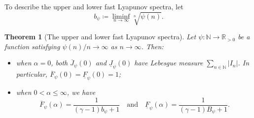 \documentclass[12pt,reqno]{amsart}
\newtheorem{thmy}{Theorem}
\renewcommand{\=}{\coloneqq}
\theoremstyle{plain}
\begin{document}
To describe the upper and lower fast Lyapunov spectra, let
\begin{equation*}\label{equ_constantsb}
   b_\psi \coloneqq \liminf_{n\to \infty}\sqrt[n]{\psi(n)}.
\end{equation*}


\begin{thmy}[The upper and lower fast Lyapunov spectra]\label{t.Upper_and_lower_fast_Lyapunov_spectrum}
Let $\psi:\mathbb{N}\to\mathbb{R}_{>0}$ be a function satisfying $\psi(n)/n \to \infty$ as $n\to \infty$. Then:
\begin{itemize}
  \item[(i)] when $\alpha =0$, both $\overline{J}_{\psi}(0)$ and $\underline{J}_{\psi}(0)$ have Lebesgue measure $\sum_{n \in \mathbb N}|I_n|$. In particular, $\overline{F}_{\psi}(0)=\underline{F}_{\psi}(0)=1$;
  \item[(ii)] when $0<\alpha \leq \infty$, we have
\begin{equation*}\label{equ:upperandlower1}
\overline{F}_{\psi}(\alpha)=\frac{1}{(\gamma-1)b_\psi+1}
\quad \text{and} \quad
\underline{F}_{\psi}(\alpha)=\frac{1}{(\gamma-1)B_\psi+1}.
\end{equation*}
\end{itemize}
\end{thmy}
\end{document}

